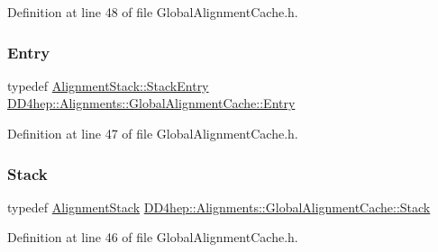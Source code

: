 Definition at line 48 of file Global\+Alignment\+Cache.\+h.

\hypertarget{class_d_d4hep_1_1_alignments_1_1_global_alignment_cache_a57c878d71fabf28ccab5c04f45f48fb1}{}\label{class_d_d4hep_1_1_alignments_1_1_global_alignment_cache_a57c878d71fabf28ccab5c04f45f48fb1} 
\subsubsection{\texorpdfstring{Entry}{Entry}}
{\footnotesize\ttfamily typedef \hyperlink{struct_d_d4hep_1_1_alignments_1_1_alignment_stack_1_1_stack_entry}{Alignment\+Stack\+::\+Stack\+Entry} \hyperlink{class_d_d4hep_1_1_alignments_1_1_global_alignment_cache_a57c878d71fabf28ccab5c04f45f48fb1}{D\+D4hep\+::\+Alignments\+::\+Global\+Alignment\+Cache\+::\+Entry}}



Definition at line 47 of file Global\+Alignment\+Cache.\+h.

\hypertarget{class_d_d4hep_1_1_alignments_1_1_global_alignment_cache_a789078b02081705b1f31774ae040523e}{}\label{class_d_d4hep_1_1_alignments_1_1_global_alignment_cache_a789078b02081705b1f31774ae040523e} 
\subsubsection{\texorpdfstring{Stack}{Stack}}
{\footnotesize\ttfamily typedef \hyperlink{class_d_d4hep_1_1_alignments_1_1_alignment_stack}{Alignment\+Stack} \hyperlink{class_d_d4hep_1_1_alignments_1_1_global_alignment_cache_a789078b02081705b1f31774ae040523e}{D\+D4hep\+::\+Alignments\+::\+Global\+Alignment\+Cache\+::\+Stack}}



Definition at line 46 of file Global\+Alignment\+Cache.\+h.

\hypertarget{class_d_d4hep_1_1_alignments_1_1_global_alignment_cache_abedb85cf969b8fb161695f5eca9717bc}{}\label{class_d_d4hep_1_1_alignments_1_1_global_alignment_cache_abedb85cf969b8fb161695f5eca9717bc} 
